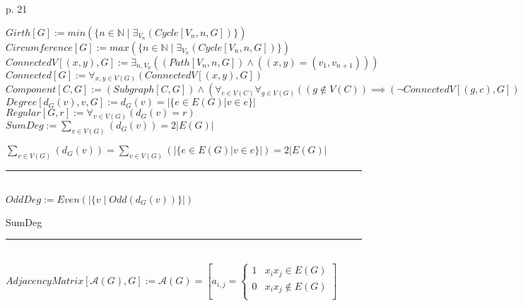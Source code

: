 \documentclass{book}
\newcommand{\abr}{:=}
\newcommand{\pr}[1]{\left(#1\right)}
\newcommand{\st}{\mathbin{|}}
\begin{document}
p. 21


$Girth[G] \abr min\pr{\{n \in \mathbb{N} \st \exists_{V_n}(Cycle[V_n, n, G])\}}$ \\
$Circumference[G] \abr max\pr{\{n \in \mathbb{N} \st \exists_{V_n}(Cycle[V_n, n, G])\}}$ \\

$ConnectedV[(x, y), G] \abr \exists_{n, V_n}\pr{(Path[V_n, n, G]) \land \pr{(x, y) = (v_1, v_{n + 1})}}$ \\
$Connected[G] \abr \forall_{x, y \in V(G)}\pr{ConnectedV[(x, y), G]}$ \\
$Component[C, G] \abr (Subgraph[C, G]) \land \pr{\forall_{c \in V(C)} \forall_{g \in V(G)}\pr{\pr{g \notin V(C)} \implies \pr{\lnot ConnectedV[(g, c), G]}}}$ \\

$Degree[d_G(v), v, G] \abr d_G(v) = |\{e \in E(G) | v \in e\}|$ \\
$Regular[G, r] \abr \forall_{v \in V(G)}\pr{d_G(v) = r}$ \\

$SumDeg \abr \sum_{v \in V(G)}\pr{d_G(v)} = 2 |E(G)|$ \\
\begin{enumerate}
  \lit $\sum_{v \in V(G)}\pr{d_G(v)} = \sum_{v \in V(G)}\pr{|\{e \in E(G) | v \in e\}|} = 2 |E(G)|$ \\
\end{enumerate} \vspace{.75mm} \hrule \vspace{.75mm} \ \\

$OddDeg \abr Even\pr{|\{v \st Odd\pr{d_G(v)}\}|}$ \\
\begin{enumerate}
  \lit SumDeg
\end{enumerate} \vspace{.75mm} \hrule \vspace{.75mm} \ \\

$AdjacencyMatrix[\mathcal{A}(G), G] \abr \mathcal{A}(G) = \left[a_{i, j} = 
\begin{cases} 
  1 & x_i x_j \in E(G) \\
  0 &  x_i x_j \notin E(G) \\
\end{cases}\right]$ \\
\end{document}
